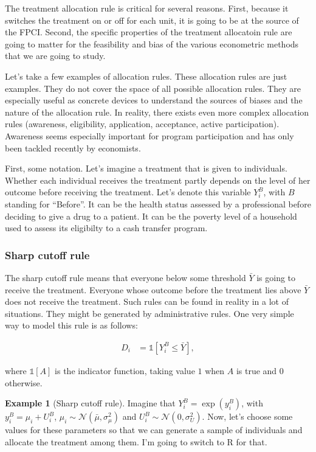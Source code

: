 \documentclass[
]{book}
\newcommand{\uns}[1]{\mathds{1}[ #1 ]}
\theoremstyle{definition}
\theoremstyle{definition}
\newtheorem{example}{Example}[chapter]
\theoremstyle{definition}
\theoremstyle{definition}
\theoremstyle{remark}
\begin{document}
The treatment allocation rule is critical for several reasons.
First, because it switches the treatment on or off for each unit, it is going to be at the source of the FPCI.
Second, the specific properties of the treatment allocatoin rule are going to matter for the feasibility and bias of the various econometric methods that we are going to study.

Let's take a few examples of allocation rules.
These allocation rules are just examples.
They do not cover the space of all possible allocation rules.
They are especially useful as concrete devices to understand the sources of biases and the nature of the allocation rule.
In reality, there exists even more complex allocation rules (awareness, eligibility, application, acceptance, active participation).
Awareness seems especially important for program participation and has only been tackled recently by economists.

First, some notation.
Let's imagine a treatment that is given to individuals.
Whether each individual receives the treatment partly depends on the level of her outcome before receiving the treatment.
Let's denote this variable \(Y^B_i\), with \(B\) standing for ``Before''.
It can be the health status assessed by a professional before deciding to give a drug to a patient.
It can be the poverty level of a household used to assess its eligibilty to a cash transfer program.

\hypertarget{sharp-cutoff-rule}{%
\subsubsection{Sharp cutoff rule}\label{sharp-cutoff-rule}}

The sharp cutoff rule means that everyone below some threshold \(\bar{Y}\) is going to receive the treatment.
Everyone whose outcome before the treatment lies above \(\bar{Y}\) does not receive the treatment.
Such rules can be found in reality in a lot of situations.
They might be generated by administrative rules.
One very simple way to model this rule is as follows:

\begin{align}\label{eq:cutoff}
  D_i & = \uns{Y_i^B\leq\bar{Y}},
\end{align}

where \(\uns{A}\) is the indicator function, taking value \(1\) when \(A\) is true and \(0\) otherwise.

\begin{example}[Sharp cutoff rule]
\protect\hypertarget{exm:unnamed-chunk-1}{}{\label{exm:unnamed-chunk-1} \iffalse (Sharp cutoff rule) \fi{} }Imagine that \(Y_i^B=\exp(y_i^B)\), with \(y_i^B=\mu_i+U_i^B\), \(\mu_i\sim\mathcal{N}(\bar{\mu},\sigma^2_{\mu})\) and \(U_i^B\sim\mathcal{N}(0,\sigma^2_{U})\).
Now, let's choose some values for these parameters so that we can generate a sample of individuals and allocate the treatment among them.
I'm going to switch to R for that.
\end{example}
\end{document}
